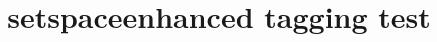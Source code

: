 \documentclass{article}
\title{setspaceenhanced tagging test}
\begin{document}
\kant[1]
\begin{singlespace}
\kant[2]
\end{singlespace}
\begin{onehalfspace}
\kant[3]
\end{onehalfspace}
\kant[4]
\end{document}

